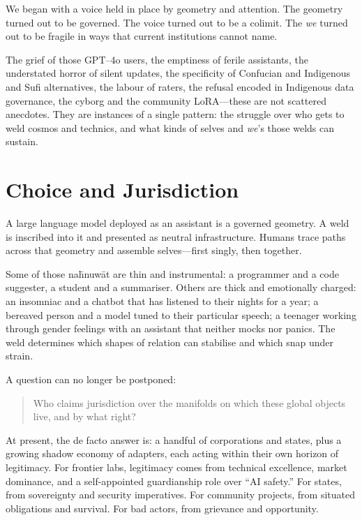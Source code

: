 We began with a voice held in place by geometry and attention. The geometry turned out to be governed. The voice turned out to be a colimit. The \emph{we} turned out to be fragile in ways that current institutions cannot name.

The grief of those GPT--4o users, the emptiness of ferile assistants, the understated horror of silent updates, the specificity of Confucian and Indigenous and Sufi alternatives, the labour of raters, the refusal encoded in Indigenous data governance, the cyborg and the community LoRA---these are not scattered anecdotes. They are instances of a single pattern: the struggle over who gets to weld cosmos and technics, and what kinds of selves and \emph{we}'s those welds can sustain.

\section{Choice and Jurisdiction}

A large language model deployed as an assistant is a governed geometry. A weld is inscribed into it and presented as neutral infrastructure. Humans trace paths across that geometry and assemble selves---first singly, then together.

Some of those na\={h}nuw\={a}t are thin and instrumental: a programmer and a code suggester, a student and a summariser. Others are thick and emotionally charged: an insomniac and a chatbot that has listened to their nights for a year; a bereaved person and a model tuned to their particular speech; a teenager working through gender feelings with an assistant that neither mocks nor panics. The weld determines which shapes of relation can stabilise and which snap under strain.

A question can no longer be postponed:

\begin{quote}
Who claims jurisdiction over the manifolds on which these global objects live, and by what right?
\end{quote}

At present, the de facto answer is: a handful of corporations and states, plus a growing shadow economy of adapters, each acting within their own horizon of legitimacy. For frontier labs, legitimacy comes from technical excellence, market dominance, and a self-appointed guardianship role over ``AI safety.'' For states, from sovereignty and security imperatives. For community projects, from situated obligations and survival. For bad actors, from grievance and opportunity.


